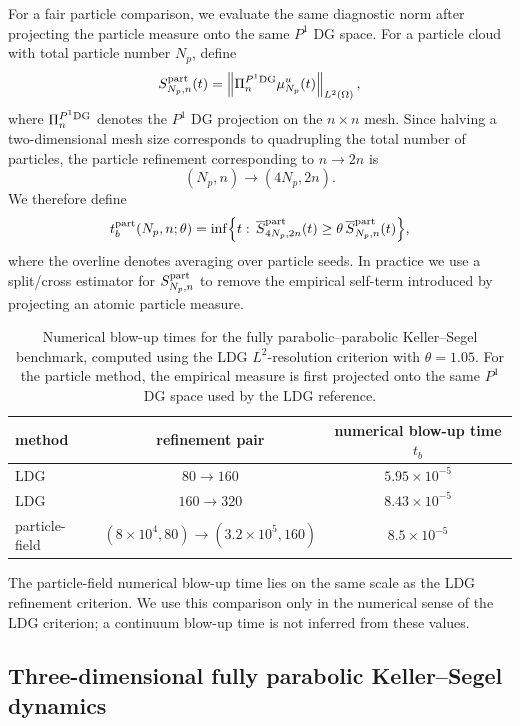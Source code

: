 \documentclass[a4paper,fleqn]{cas-sc}
\theoremstyle{definition}
\theoremstyle{remark}
\begin{document}
For a fair particle comparison, we evaluate the same diagnostic norm after projecting
the particle measure onto the same \(P^1\) DG space.  For a particle cloud with total
particle number \(N_p\), define
\[
    S_{N_p,n}^{\rm part}(t)
    =
    \left\|
    \Pi_n^{P^1{\rm DG}}\mu_{N_p}^u(t)
    \right\|_{L^2(\Omega)},
\]
where \(\Pi_n^{P^1{\rm DG}}\) denotes the \(P^1\) DG projection on the \(n\times n\)
mesh.  Since halving a two-dimensional mesh size corresponds to quadrupling the total
number of particles, the particle refinement corresponding to \(n\to2n\) is
\[
    (N_p,n)\longrightarrow(4N_p,2n).
\]
We therefore define
\[
    t_b^{\rm part}(N_p,n;\theta)
    =
    \inf\Bigl\{
    t:\,
    \overline S_{4N_p,2n}^{\rm part}(t)
    \ge
    \theta\,
    \overline S_{N_p,n}^{\rm part}(t)
    \Bigr\},
\]
where the overline denotes averaging over particle seeds.  In practice we use a
split/cross estimator for \(S_{N_p,n}^{\rm part}\) to remove the empirical self-term
introduced by projecting an atomic particle measure.\begin{table}[t]
\centering
\caption{Numerical blow-up times for the fully parabolic--parabolic Keller--Segel
benchmark, computed using the LDG \(L^2\)-resolution criterion with \(\theta=1.05\).
For the particle method, the empirical measure is first projected onto the same
\(P^1\) DG space used by the LDG reference.}
\label{tab:ks_pp_tb}
\begin{tabular}{l c c}
\toprule
method & refinement pair & numerical blow-up time \(t_b\) \\
\midrule
LDG
& \(80\to160\)
& \(5.95\times10^{-5}\) \\
LDG
& \(160\to320\)
& \(8.43\times10^{-5}\) \\
particle-field
& \((8\times10^4,80)\to(3.2\times10^5,160)\)
& \(8.5\times10^{-5}\) \\
\bottomrule
\end{tabular}
\end{table}
The particle-field numerical blow-up time lies on the same scale as the LDG refinement
criterion.  We use this comparison only in the numerical sense of the LDG criterion; a
continuum blow-up time is not inferred from these values.

\subsection{Three-dimensional fully parabolic Keller--Segel dynamics}
\label{sec:ks3d_pp}
\end{document}
